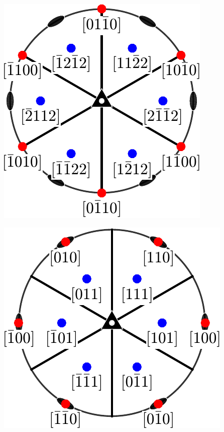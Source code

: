 \documentclass[compress]{beamer}
\begin{document}
\begin{frame}[fragile]
\begin{center}
\begin{minipage}[t]{0.3\linewidth}
      \includegraphics[width=\textwidth]{pic/uvtw}
    \end{minipage}
    \hfill
    \begin{minipage}[t]{0.34\linewidth}
       \vspace{0pt}
      \includegraphics[width=\textwidth]{pic/uvw}
    \end{minipage}
  \end{center}


\end{frame}
\end{document}
